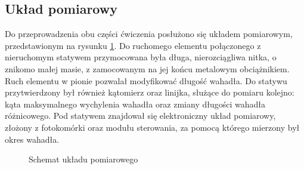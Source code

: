 \documentclass[a4paper]{article}
\newlength{\du}
\begin{document}
\subsection{Układ pomiarowy}
Do przeprowadzenia obu części ćwiczenia posłużono się układem pomiarowym, przedstawionym na rysunku \ref{uklad_pomiarowy}. Do ruchomego elementu połączonego z nieruchomym statywem przymocowana była długa, nierozciągliwa nitka, o znikomo małej masie, z zamocowanym na jej końcu metalowym obciążnikiem. Ruch elementu w pionie pozwalał modyfikować długość wahadła. Do statywu przytwierdzony był również kątomierz oraz linijka, służące do pomiaru kolejno: kąta maksymalnego wychylenia wahadła oraz zmiany długości wahadła różnicowego. Pod statywem znajdował się elektroniczny układ pomiarowy, złożony z fotokomórki oraz modułu sterowania, za pomocą którego mierzony był okres wahadła.


\begin{figure}[b]
\caption{Schemat układu pomiarowego}

\label{uklad_pomiarowy}
\end{figure}
\end{document}
